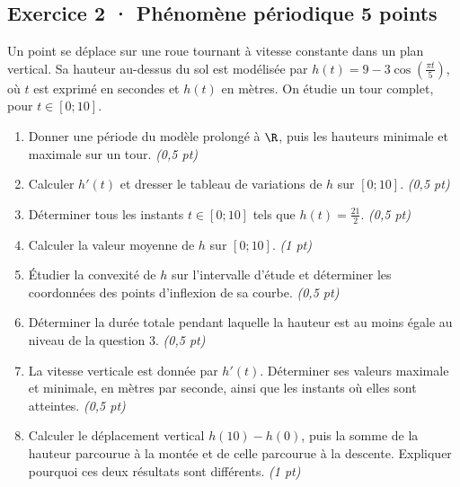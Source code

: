 \subsection*{Exercice 2 · Phénomène périodique \hfill 5 points}Un point se déplace sur une roue tournant à vitesse constante dans un plan vertical. Sa hauteur au-dessus du sol est modélisée par $h(t)=9-3\cos\left(\frac{\pi t}{5}\right)$, où $t$ est exprimé en secondes et $h(t)$ en mètres. On étudie un tour complet, pour $t\in[0;10]$.

\begin{enumerate}

\item Donner une période du modèle prolongé à $\R$, puis les hauteurs minimale et maximale sur un tour. \hfill\textit{(0,5 pt)}

\item Calculer $h'(t)$ et dresser le tableau de variations de $h$ sur $[0;10]$. \hfill\textit{(0,5 pt)}

\item Déterminer tous les instants $t\in[0;10]$ tels que $h(t)=\frac{21}{2}$. \hfill\textit{(0,5 pt)}

\item Calculer la valeur moyenne de $h$ sur $[0;10]$. \hfill\textit{(1 pt)}

\item Étudier la convexité de $h$ sur l'intervalle d'étude et déterminer les coordonnées des points d'inflexion de sa courbe. \hfill\textit{(0,5 pt)}

\item Déterminer la durée totale pendant laquelle la hauteur est au moins égale au niveau de la question 3. \hfill\textit{(0,5 pt)}

\item La vitesse verticale est donnée par $h'(t)$. Déterminer ses valeurs maximale et minimale, en mètres par seconde, ainsi que les instants où elles sont atteintes. \hfill\textit{(0,5 pt)}

\item Calculer le déplacement vertical $h(10)-h(0)$, puis la somme de la hauteur parcourue à la montée et de celle parcourue à la descente. Expliquer pourquoi ces deux résultats sont différents. \hfill\textit{(1 pt)}

\end{enumerate}

\clearpage{}\par

